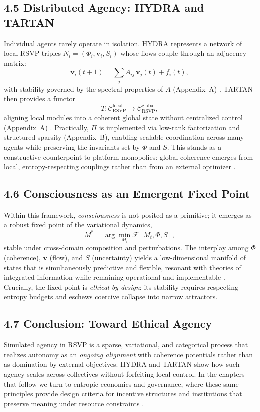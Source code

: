 \documentclass[12pt]{article}
\begin{document}
\subsection*{4.5 Distributed Agency: HYDRA and TARTAN}
Individual agents rarely operate in isolation. HYDRA represents a network of local RSVP triples \(N_i = (\Phi_i,\mathbf{v}_i,S_i)\) whose flows couple through an adjacency matrix:
\[
\mathbf{v}_i(t+1) = \sum_j A_{ij} \,\mathbf{v}_j(t) + f_i(t),
\]
with stability governed by the spectral properties of \(A\) (Appendix~A) \citep{bird1988}. TARTAN then provides a functor
\[
T : \mathcal{C}_{\text{RSVP}}^{\mathrm{local}} \to \mathcal{C}_{\text{RSVP}}^{\mathrm{global}},
\]
aligning local modules into a coherent global state without centralized control (Appendix~A) \citep{milewski2018}. Practically, \(\Pi\) is implemented via low-rank factorization and structured sparsity (Appendix~B), enabling scalable coordination across many agents while preserving the invariants set by \(\Phi\) and \(S\). This stands as a constructive counterpoint to platform monopolies: global coherence emerges from local, entropy-respecting couplings rather than from an external optimizer \citep{zuboff2019}.

\subsection*{4.6 Consciousness as an Emergent Fixed Point}
Within this framework, \emph{consciousness} is not posited as a primitive; it emerges as a robust fixed point of the variational dynamics,
\[
M^\ast = \arg\min_{M_t} \mathcal{F}[M_t,\Phi,S],
\]
stable under cross-domain composition and perturbations. The interplay among \(\Phi\) (coherence), \(\mathbf{v}\) (flow), and \(S\) (uncertainty) yields a low-dimensional manifold of states that is simultaneously predictive and flexible, resonant with theories of integrated information while remaining operational and implementable \citep{tononi2004, hohwy2013}. Crucially, the fixed point is \emph{ethical by design}: its stability requires respecting entropy budgets and eschews coercive collapse into narrow attractors.

\subsection*{4.7 Conclusion: Toward Ethical Agency}
Simulated agency in RSVP is a sparse, variational, and categorical process that realizes autonomy as an \emph{ongoing alignment} with coherence potentials rather than as domination by external objectives. HYDRA and TARTAN show how such agency scales across collectives without forfeiting local control. In the chapters that follow we turn to entropic economics and governance, where these same principles provide design criteria for incentive structures and institutions that preserve meaning under resource constraints \citep{hanson2003, ortega1957}.
\end{document}
